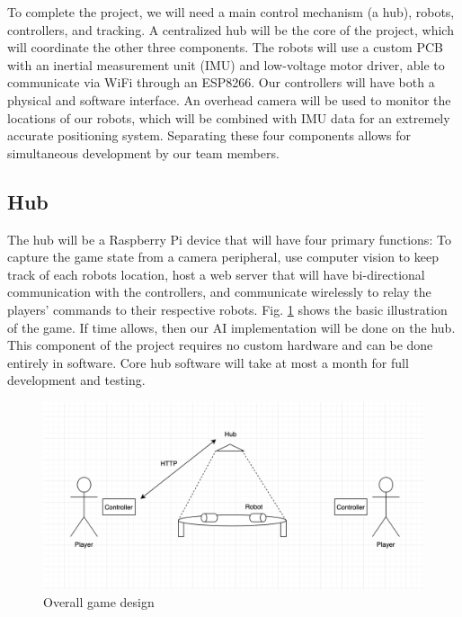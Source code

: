 \documentclass[11pt]{ieeeconf}
\begin{document}
To complete the project, we will need a main control mechanism (a hub), robots, controllers, and tracking. A centralized hub will be the core of the project, which will coordinate the other three components. The robots will use a custom PCB with an inertial measurement unit (IMU) and low-voltage motor driver, able to communicate via WiFi through an ESP8266. Our controllers will have both a physical and software interface. An overhead camera will be used to monitor the locations of our robots, which will be combined with IMU data for an extremely accurate positioning system. Separating these four components allows for simultaneous development by our team members.

\subsection{Hub}

The hub will be a Raspberry Pi device that will have four primary functions: To capture the game state from a camera peripheral, use computer vision to keep track of each robots location, host a web server that will have bi-directional communication with the controllers, and communicate wirelessly to relay the players' commands to their respective robots. Fig. \ref{Illustration} shows the basic illustration of the game. If time allows, then our AI implementation will be done on the hub. This component of the project requires no custom hardware and can be done entirely in software. Core hub software will take at most a month for full development and testing. 

 \begin{figure}[!t]
  \centering
  \captionsetup{justification=centering}
      \includegraphics[width=14cm]{images/Overall.png}
        \caption{Overall game design}
        \label{Illustration}
\end{figure}
\end{document}
